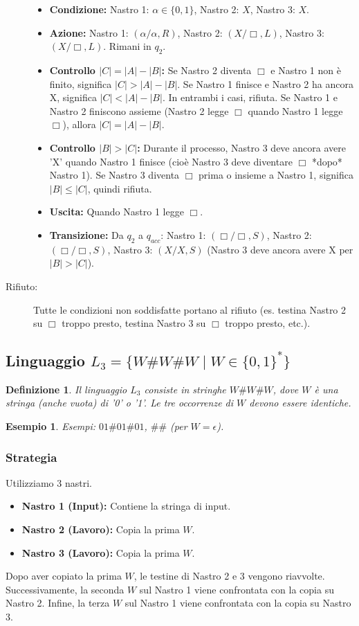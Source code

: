 \documentclass[a4paper, 11pt]{book} %
\newtheorem{definition}[theorem]{Definizione}
\newtheorem{example}[theorem]{Esempio}
\theoremstyle{definition}
\begin{document}
\begin{description}
    \begin{itemize}
        \item \textbf{Condizione:} Nastro 1: $\alpha \in \{0,1\}$, Nastro 2: $X$, Nastro 3: $X$.
        \item \textbf{Azione:} Nastro 1: $(\alpha/\alpha, R)$, Nastro 2: $(X/\Box, L)$, Nastro 3: $(X/\Box, L)$. Rimani in $q_2$.
        \item \textbf{Controllo $|C|=|A|-|B|$:} Se Nastro 2 diventa $\Box$ e Nastro 1 non è finito, significa $|C|>|A|-|B|$. Se Nastro 1 finisce e Nastro 2 ha ancora X, significa $|C|<|A|-|B|$. In entrambi i casi, rifiuta. Se Nastro 1 e Nastro 2 finiscono assieme (Nastro 2 legge $\Box$ quando Nastro 1 legge $\Box$), allora $|C|=|A|-|B|$.
        \item \textbf{Controllo $|B|>|C|$:} Durante il processo, Nastro 3 deve ancora avere 'X' quando Nastro 1 finisce (cioè Nastro 3 deve diventare $\Box$ *dopo* Nastro 1). Se Nastro 3 diventa $\Box$ prima o insieme a Nastro 1, significa $|B| \le |C|$, quindi rifiuta.
        \item \textbf{Uscita:} Quando Nastro 1 legge $\Box$.
        \item \textbf{Transizione:} Da $q_2$ a $q_{acc}$: Nastro 1: $(\Box/\Box, S)$, Nastro 2: $(\Box/\Box, S)$, Nastro 3: $(X/X, S)$ (Nastro 3 deve ancora avere X per $|B|>|C|$).
    \end{itemize}
    \item[Rifiuto:] Tutte le condizioni non soddisfatte portano al rifiuto (es. testina Nastro 2 su $\Box$ troppo presto, testina Nastro 3 su $\Box$ troppo presto, etc.).
\end{description}

\subsection{Linguaggio $L_3 = \{W\#W\#W \mid W \in \{0,1\}^*\}$}
\begin{definition}
Il linguaggio $L_3$ consiste in stringhe $W\#W\#W$, dove $W$ è una stringa (anche vuota) di '0' o '1'. Le tre occorrenze di $W$ devono essere identiche.
\end{definition}
\begin{example}
Esempi: $01\#01\#01$, $\#\#$ (per $W=\epsilon$).
\end{example}

\subsubsection{Strategia}
Utilizziamo 3 nastri.
\begin{itemize}
    \item \textbf{Nastro 1 (Input):} Contiene la stringa di input.
    \item \textbf{Nastro 2 (Lavoro):} Copia la prima $W$.
    \item \textbf{Nastro 3 (Lavoro):} Copia la prima $W$.
\end{itemize}
Dopo aver copiato la prima $W$, le testine di Nastro 2 e 3 vengono riavvolte. Successivamente, la seconda $W$ sul Nastro 1 viene confrontata con la copia su Nastro 2. Infine, la terza $W$ sul Nastro 1 viene confrontata con la copia su Nastro 3.
\end{document}
